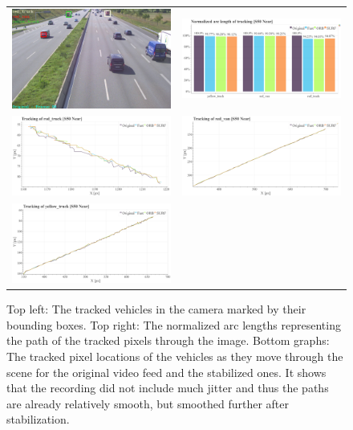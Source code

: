 \begin{figure}[!ht]
  \centering
  \begin{tabular}{cc}
    \includegraphics[width=0.45\linewidth]{diagrams/object_tracking/s50_s_near/frame.png}    &  
    \includegraphics[width=0.475\linewidth]{diagrams/object_tracking/s50_s_near/normalized_arc_lengths.html.png}    \\

    \includegraphics[width=0.475\linewidth]{diagrams/object_tracking/s50_s_near/red_truck.png}    &  
    \includegraphics[width=0.475\linewidth]{diagrams/object_tracking/s50_s_near/red_van.png}    \\  
    \includegraphics[width=0.475\linewidth]{diagrams/object_tracking/s50_s_near/yellow_truck.png}   
  \end{tabular}
  \caption{Top left:
  The tracked vehicles in the camera  marked by their bounding boxes. 
  Top right: 
  The normalized arc lengths representing the path of the tracked pixels through the image.
  Bottom graphs:
  The tracked pixel locations of the vehicles as they move through the scene for the original video feed and the stabilized ones.
  It shows that the recording did not include much jitter and thus the paths are already relatively smooth, but smoothed further after stabilization.
  }
  \label{fig:object_tracking_appendix_s50_s_near}
\end{figure}

